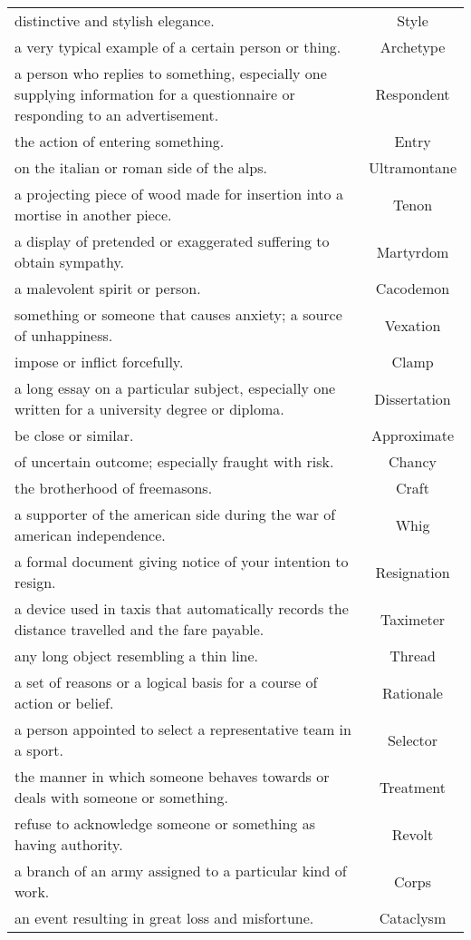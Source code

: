\begin{longtable}{p{12cm}c}
distinctive and stylish elegance. & Style\\
a very typical example of a certain person or thing. & Archetype\\
a person who replies to something, especially one supplying information for a questionnaire or responding to an advertisement. & Respondent\\
the action of entering something. & Entry\\
on the italian or roman side of the alps. & Ultramontane\\
a projecting piece of wood made for insertion into a mortise in another piece. & Tenon\\
a display of pretended or exaggerated suffering to obtain sympathy. & Martyrdom\\
a malevolent spirit or person. & Cacodemon\\
something or someone that causes anxiety; a source of unhappiness. & Vexation\\
impose or inflict forcefully. & Clamp\\
a long essay on a particular subject, especially one written for a university degree or diploma. & Dissertation\\
be close or similar. & Approximate\\
of uncertain outcome; especially fraught with risk. & Chancy\\
the brotherhood of freemasons. & Craft\\
a supporter of the american side during the war of american independence. & Whig\\
a formal document giving notice of your intention to resign. & Resignation\\
a device used in taxis that automatically records the distance travelled and the fare payable. & Taximeter\\
any long object resembling a thin line. & Thread\\
a set of reasons or a logical basis for a course of action or belief. & Rationale\\
a person appointed to select a representative team in a sport. & Selector\\
the manner in which someone behaves towards or deals with someone or something. & Treatment\\
refuse to acknowledge someone or something as having authority. & Revolt\\
a branch of an army assigned to a particular kind of work. & Corps\\
an event resulting in great loss and misfortune. & Cataclysm\\

\end{longtable}
